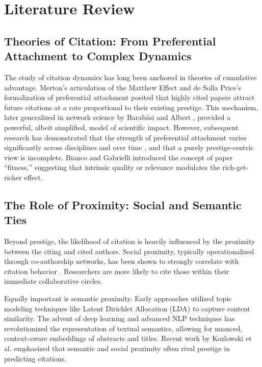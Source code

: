 \documentclass[12pt,a4paper]{article}
\begin{document}
\section{Literature Review}

\subsection{Theories of Citation: From Preferential Attachment to Complex Dynamics}
The study of citation dynamics has long been anchored in theories of cumulative advantage. Merton's articulation of the Matthew Effect \cite{merton1968matthew} and de Solla Price's formalization of preferential attachment \cite{de1976general} posited that highly cited papers attract future citations at a rate proportional to their existing prestige. This mechanism, later generalized in network science by Barab\'asi and Albert \cite{barabasi1999emergence}, provided a powerful, albeit simplified, model of scientific impact. However, subsequent research has demonstrated that the strength of preferential attachment varies significantly across disciplines and over time \cite{wang2008measuring}, and that a purely prestige-centric view is incomplete. Bianco and Gabrielli \cite{bianco2008fitness} introduced the concept of paper ``fitness,'' suggesting that intrinsic quality or relevance modulates the rich-get-richer effect.

\subsection{The Role of Proximity: Social and Semantic Ties}
Beyond prestige, the likelihood of citation is heavily influenced by the proximity between the citing and cited authors. Social proximity, typically operationalized through co-authorship networks, has been shown to strongly correlate with citation behavior \cite{newman2004coauthorship, kumar2015co, martin2013coauthorship}. Researchers are more likely to cite those within their immediate collaborative circles.

Equally important is semantic proximity. Early approaches utilized topic modeling techniques like Latent Dirichlet Allocation (LDA) \cite{blei2003latent} to capture content similarity. The advent of deep learning and advanced NLP techniques has revolutionized the representation of textual semantics, allowing for nuanced, context-aware embeddings of abstracts and titles. Recent work by Kozlowski et al. \cite{kozlowski2025citation} emphasized that semantic and social proximity often rival prestige in predicting citations.
\end{document}
